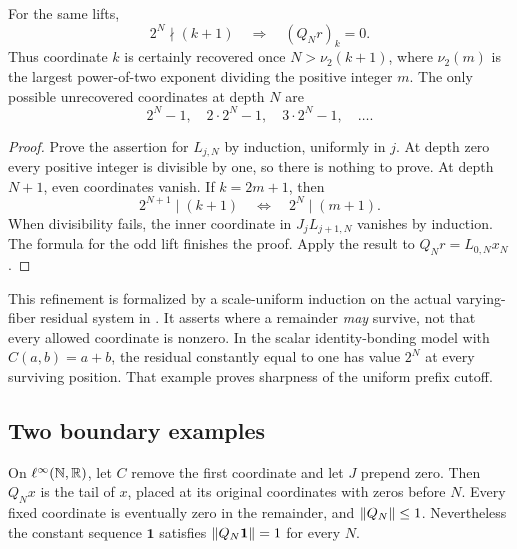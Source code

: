 \begin{proposition}\label{KS55}
For the same lifts,
\[
 2^N\nmid(k+1)\quad\Longrightarrow\quad(Q_Nr)_k=0.
\]
Thus coordinate \(k\) is certainly recovered once \(N>\nu_2(k+1)\), where \(\nu_2(m)\) is the largest power-of-two exponent dividing the positive integer \(m\). The only possible unrecovered coordinates at depth \(N\) are
\[
 2^N-1,\quad 2\cdot2^N-1,\quad3\cdot2^N-1,\quad\ldots.
\]
\end{proposition}
\begin{proof}
Prove the assertion for \(L_{j,N}\) by induction, uniformly in \(j\). At depth zero every positive integer is divisible by one, so there is nothing to prove. At depth \(N+1\), even coordinates vanish. If \(k=2m+1\), then
\[
 2^{N+1}\mid(k+1)\quad\Longleftrightarrow\quad2^N\mid(m+1).
\]
When divisibility fails, the inner coordinate in \(J_jL_{j+1,N}\) vanishes by induction. The formula for the odd lift finishes the proof. Apply the result to \(Q_Nr=L_{0,N}x_N\).
\end{proof}
This refinement is formalized by a scale-uniform induction on the actual varying-fiber residual system in . It asserts where a remainder \emph{may} survive, not that every allowed coordinate is nonzero. In the scalar identity-bonding model with \(C(a,b)=a+b\), the residual constantly equal to one has value \(2^N\) at every surviving position. That example proves sharpness of the uniform prefix cutoff.


\subsection{Two boundary examples}
On \(\ell^\infty(\mathbb N,\mathbb R)\), let \(C\) remove the first coordinate and let \(J\) prepend zero. Then \(Q_Nx\) is the tail of \(x\), placed at its original coordinates with zeros before \(N\). Every fixed coordinate is eventually zero in the remainder, and \(\left\lVert Q_N\right\rVert\le1\). Nevertheless the constant sequence \(\mathbf1\) satisfies \(\left\lVert Q_N\mathbf1\right\rVert=1\) for every \(N\).

